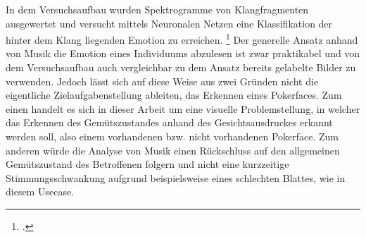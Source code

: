 \documentclass[12pt, a4paper]{report}
\begin{document}
In dem Versuchsaufbau wurden Spektrogramme von Klangfragmenten ausgewertet und versucht mittels Neuronalen Netzen eine Klassifikation der hinter dem Klang liegenden Emotion zu erreichen.
\footcite[Vgl. ][Abstract]{EmotionInSound}
Der generelle Ansatz anhand von Musik die Emotion eines Individuums abzulesen ist zwar praktikabel und von dem Versuchsaufbau auch vergleichbar zu dem Ansatz bereits gelabelte Bilder zu verwenden. Jedoch lässt sich auf diese Weise aus zwei Gründen nicht die eigentliche Zielaufgabenstellung ableiten, das Erkennen eines Pokerfaces. Zum einen handelt es sich in dieser Arbeit um eine visuelle Problemstellung, in welcher das Erkennen des Gemütszustandes anhand des Gesichtsausdruckes erkannt werden soll, also einem vorhandenen bzw. nicht vorhandenen Pokerface. Zum anderen würde die Analyse von Musik einen Rückschluss auf den allgemeinen Gemütszustand des Betroffenen folgern und nicht eine kurzzeitige Stimmungsschwankung aufgrund beispielsweise eines schlechten Blattes, wie in diesem Usecase.

\let\cleardoublepage\relax
\newpage

\printbibheading
\printbibliography[type=book,heading=subbibliography,title={Literaturquellen}]
\pagestyle{empty}
\printbibliography[type=misc,heading=subbibliography,title={Sonstige Quellen}]
\pagestyle{empty}
\newpage
\pagestyle{empty}
\end{document}
